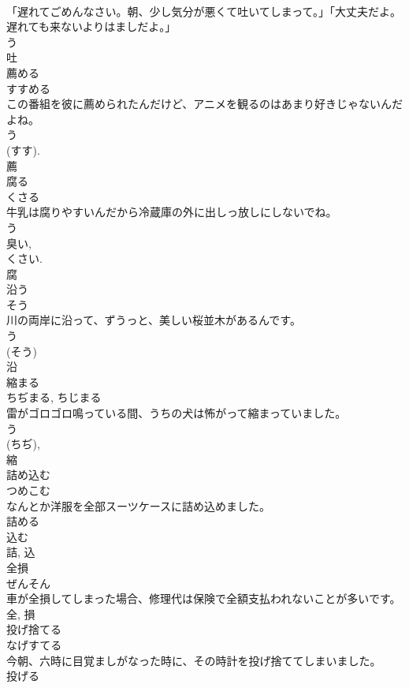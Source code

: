 \documentclass[8pt]{extreport}
\begin{document}
\begin{CJK}{UTF8}{min}
\\	「遅れてごめんなさい。朝、少し気分が悪くて吐いてしまって。」「大丈夫だよ。遅れても来ないよりはましだよ。」	
\\	う 
\\	吐	
\\	薦める	
\\	すすめる	
\\	この番組を彼に薦められたんだけど、アニメを観るのはあまり好きじゃないんだよね。	
\\	う 
\\	(すす). 
\\	薦	
\\	腐る	
\\	くさる	
\\	牛乳は腐りやすいんだから冷蔵庫の外に出しっ放しにしないでね。	
\\	う 
\\	臭い, 
\\	くさい.
\\	腐	
\\	沿う	
\\	そう	
\\	川の両岸に沿って、ずうっと、美しい桜並木があるんです。	
\\	う 
\\	(そう) 
\\	沿	
\\	縮まる	
\\	ちぢまる, ちじまる	
\\	雷がゴロゴロ鳴っている間、うちの犬は怖がって縮まっていました。	
\\	う 
\\	(ちぢ), 
\\	縮	
\\	詰め込む	
\\	つめこむ	
\\	なんとか洋服を全部スーツケースに詰め込めました。	
\\	詰める 
\\	込む 
\\	詰, 込	
\\	全損	
\\	ぜんそん	
\\	車が全損してしまった場合、修理代は保険で全額支払われないことが多いです。	
\\	全, 損	
\\	投げ捨てる	
\\	なげすてる	
\\	今朝、六時に目覚ましがなった時に、その時計を投げ捨ててしまいました。	
\\	投げる 

\end{CJK}
\end{document}
